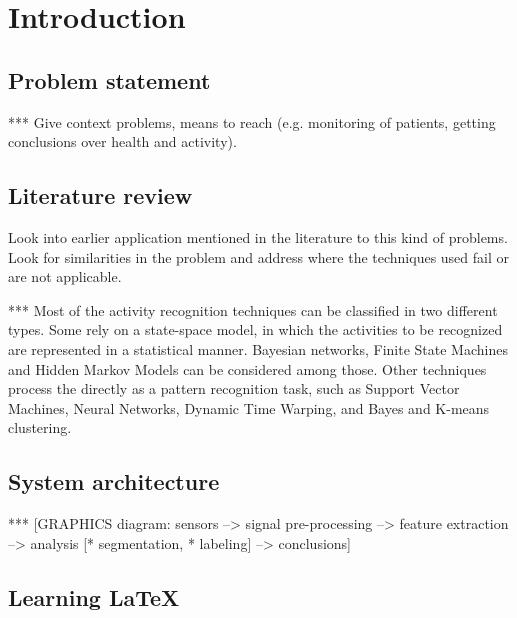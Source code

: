 
\chapter{Introduction} %

\label{Chapter1} %



\section{Problem statement}
*** Give context problems, means to reach (e.g. monitoring of patients,  getting conclusions over health and activity).

\section{Literature review}
Look into earlier application mentioned in the literature to this kind of  problems. Look for similarities in the problem and address where the  techniques used fail or are not applicable.

*** Most of the activity recognition techniques can be classified in two  different types.
Some rely on a state-space model, in which the activities to be recognized are represented in a statistical manner.
Bayesian networks, Finite State Machines and Hidden Markov Models can be considered among those.
Other techniques process the directly as a pattern recognition task, such as  Support Vector Machines, Neural Networks, Dynamic Time Warping, and Bayes and K-means clustering.


\section{System architecture}

*** [GRAPHICS diagram: sensors --> signal pre-processing --> feature extraction --> analysis [* segmentation, * labeling] --> conclusions]




\section{Learning \LaTeX{}}

